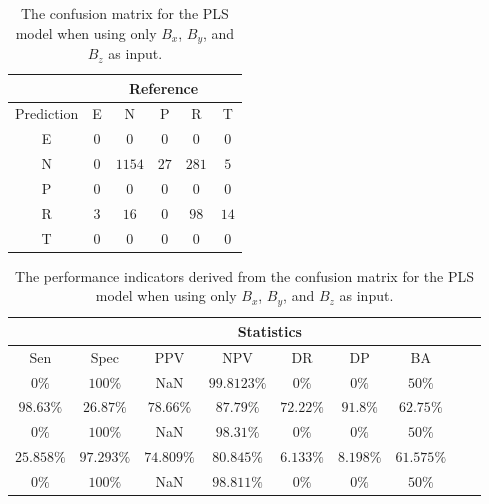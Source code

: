 \begin{table}[!ht]
	\centering
	\begin{tabular}{|c|c|c|c|c|c|}
		\hline
		 & \multicolumn{5}{|c|}{Reference} \\ \hline
		 Prediction & E & N & P & R & T \\ \hline
		 E & $0$ & $0$ & $0$ & $0$ & $0$ \\ \hline
		 N & $0$ & $1154$ & $27$ & $281$ & $5$ \\ \hline
		 P & $0$ & $0$ & $0$ & $0$ & $0$ \\ \hline
		 R & $3$ & $16$ & $0$ & $98$ & $14$ \\ \hline
		 T & $0$ & $0$ & $0$ & $0$ & $0$ \\ \hline
	\end{tabular}
	\caption{The confusion matrix for the PLS model when using only $B_{x}$, $B_{y}$, and $B_{z}$ as input.}
	\label{tab:cm:coord:pls}
\end{table}

\begin{table}[!ht]
	\centering
	\begin{tabular}{|c|c|c|c|c|c|c|c|c|}
		\hline
		 & \multicolumn{7}{c|}{Statistics} \\ \hline
		Sen & Spec & PPV & NPV & DR & DP & BA \\ \hline
		$0\%$ & $100\%$ & NaN & $99.8123\%$ & $0\%$ & $0\%$ & $50\%$ \\ \hline
		$98.63\%$ & $26.87\%$ & $78.66\%$ & $87.79\%$ & $72.22\%$ & $91.8\%$ & $62.75\%$ \\ \hline
		$0\%$ & $100\%$ & NaN & $98.31\%$ & $0\%$ & $0\%$ & $50\%$ \\ \hline
		$25.858\%$ & $97.293\%$ & $74.809\%$ & $80.845\%$ & $6.133\%$ & $8.198\%$ & $61.575\%$ \\ \hline
		$0\%$ & $100\%$ & NaN & $98.811\%$ & $0\%$ & $0\%$ & $50\%$ \\ \hline
	\end{tabular}
	\caption{The performance indicators derived from the confusion matrix for the PLS model when using only $B_{x}$, $B_{y}$, and $B_{z}$ as input.}
	\label{tab:cs:coord:pls}
\end{table}

